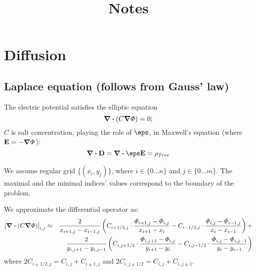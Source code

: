 \documentclass[11pt]{article}
\title{Notes}
\begin{document}
\maketitle
\section{Diffusion}
\subsection{Laplace equation (follows from Gauss' law)}
The electric potential satisfies the elliptic equation
\begin{equation}
	\boldsymbol{\nabla} \boldsymbol{\cdot} (C \boldsymbol{\nabla} \varPhi) = 0; \label{Phi eqn}
\end{equation}
$C$ is salt concentration, playing the role of $\eps$,
in Maxwell's equation (where $\mathbf{E} = -\boldsymbol{\nabla} \varPhi$):
\begin{equation}
\bnabla \bcdot \vect{D} = \bnabla \bcdot \eps \vect{E} = \rho_{free}
\end{equation}

We assume regular grid $\{(x_i, y_j)\}$,
where $i\in\{0 \ldots n\}$ and $j\in\{0 \ldots m\}$. The maximal and the
minimal indices' values correspond to the boundary of the problem.

We approximate the differential operator as:
\begin{eqnarray}
\left[ \boldsymbol{\nabla} \boldsymbol{\cdot} (C \boldsymbol{\nabla} \varPhi) \right]_{i,j}
&\approx &\frac{2}{x_{i+1,j} - x_{i-1,j}} \left(
C_{i+1/2,j} \cdot \frac{\varPhi_{i+1,j}-\varPhi_{i,j}}{x_{i+1}-x_{i}} -
C_{i-1/2,j} \cdot \frac{\varPhi_{i,j}-\varPhi_{i-1,j}}{x_{i}-x_{i-1}}
\right) + \\
&&\frac{2}{y_{i,j+1} - y_{i,j-1}} \left(C_{i,j+1/2} \cdot \frac{\varPhi_{i,j+1}-\varPhi_{i,j}}{y_{i+1}-y_{i}} -
C_{i,j-1/2} \cdot \frac{\varPhi_{i,j}-\varPhi_{i,j-1}}{y_{i}-y_{i-1}}
\right)
\end{eqnarray}
where $2C_{i\pm 1/2,j} = C_{i,j} + C_{i\pm 1,j}$ and
$2C_{i,j\pm 1/2} = C_{i,j} + C_{i,j\pm 1}$.
\end{document}
